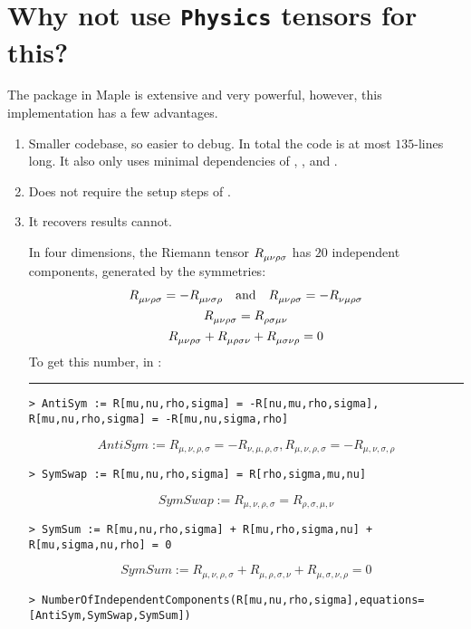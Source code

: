 \documentclass{article}
\begin{document}
\section{Why not use \texttt{Physics} tensors for this?}
The \verb@Physics@ package in Maple is extensive and very powerful, however, this implementation has a few advantages.
\begin{enumerate}
\item Smaller codebase, so easier to debug. In total the code is at most $135$-lines long. It also only uses minimal dependencies of \verb@combinat@, \verb@ArrayTools@, and \verb@GroupTheory@.
\item Does not require the setup steps of \verb@Physics@.
\item It recovers results \verb@Physics@ cannot.

In four dimensions, the Riemann tensor $\tensor{R}{_\mu_\nu_\rho_\sigma}$ has $20$ independent components, generated by the symmetries:
\begin{gather*}
\tensor{R}{_\mu_\nu_\rho_\sigma} = -\tensor{R}{_\mu_\nu_\sigma_\rho}\qand  
\tensor{R}{_\mu_\nu_\rho_\sigma} = -\tensor{R}{_\nu_\mu_\rho_\sigma} \\
\tensor{R}{_\mu_\nu_\rho_\sigma} = \tensor{R}{_\rho_\sigma_\mu_\nu} \\
\tensor{R}{_\mu_\nu_\rho_\sigma} + \tensor{R}{_\mu_\rho_\sigma_\nu} + \tensor{R}{_\mu_\sigma_\nu_\rho} = 0 
\end{gather*}
To get this number, in \verb@GraClo@:
\newline\rule{\linewidth}{0.4pt}
\begin{verbatim}
> AntiSym := R[mu,nu,rho,sigma] = -R[nu,mu,rho,sigma], R[mu,nu,rho,sigma] = -R[mu,nu,sigma,rho]
\end{verbatim}
\[
AntiSym := R_{\mu ,\nu ,\rho ,\sigma} =- R_{\nu ,\mu ,\rho ,\sigma},  R_{\mu ,\nu ,\rho ,\sigma} =- R_{\mu ,\nu ,\sigma ,\rho}
\]
\begin{verbatim}
> SymSwap := R[mu,nu,rho,sigma] = R[rho,sigma,mu,nu] 
\end{verbatim}
\[
SymSwap := R_{\mu ,\nu ,\rho ,\sigma} = R_{\rho ,\sigma ,\mu ,\nu}
\]
\begin{verbatim}
> SymSum := R[mu,nu,rho,sigma] + R[mu,rho,sigma,nu] + R[mu,sigma,nu,rho] = 0 
\end{verbatim}
\[
SymSum := R_{\mu ,\nu ,\rho ,\sigma}+R_{\mu ,\rho ,\sigma ,\nu}+R_{\mu ,\sigma ,\nu ,\rho} = 0
\]
\begin{verbatim}
> NumberOfIndependentComponents(R[mu,nu,rho,sigma],equations=[AntiSym,SymSwap,SymSum]) 

\end{verbatim}
\end{enumerate}
\end{document}
